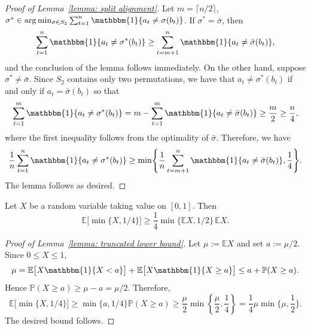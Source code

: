 \documentclass[twoside,11pt]{article}
\theoremstyle{remark}
\begin{document}
\begin{proof}[Proof of Lemma~\ref{lemma: split alignment}]
Let $m=\lceil n/2\rceil$, $\sigma^*
\in
\arg\min_{\sigma\in S_2}
\sum_{t=1}^{n}
\mathbbm{1}\{a_t\neq\sigma(b_t)\}$.
If $\sigma^*=\bar{\sigma}$, then
%
\begin{equation*}
\sum_{t=1}^{n}
\mathbbm{1}\{a_t\neq\sigma^*(b_t)\}
\ge
\sum_{t=m+1}^{n}
\mathbbm{1}\{a_t\neq\bar{\sigma}(b_t)\},   
\end{equation*}
%
and the conclusion of the lemma follows immediately. On the other hand, suppose $\sigma^*\neq\bar{\sigma}$. Since $S_2$ contains only two permutations, we have that $a_t \neq \sigma^*(b_t)$ if and only if $a_t = \bar{\sigma}(b_t)$ so that
%
\begin{equation*}
\sum_{t=1}^{m}
\mathbbm{1}\{a_t\neq\sigma^*(b_t)\}
=
m-
\sum_{t=1}^{m}
\mathbbm{1}\{a_t\neq\bar{\sigma}(b_t)\}
\ge
\frac m2
\ge
\frac n4,
\end{equation*}
%
where the first inequality follows from the optimality of $\bar\sigma$. 
Therefore, we have
%
\begin{equation*}
\frac{1}{n}\sum_{t=1}^{n}
\mathbbm{1}\{a_t\neq\sigma^*(b_t)\}
\ge
\min\Biggl\{
\frac{1}{n}\sum_{t=m+1}^{n}
\mathbbm{1}\{a_t\neq\bar{\sigma}(b_t)\},
\frac 14
\Biggr\}.    
\end{equation*}
%
The lemma follows as desired.
\end{proof}



\begin{lemma}
\label{lemma: truncated lower bound}
Let $X$ be a random variable taking value on $[0, 1]$. Then
%
\begin{equation*}
\mathbb{E}\bigl[\min\{X, 1/4\}\bigr]
\ge
\frac{1}{4}\min\bigl\{\mathbb{E}X, 1/2\bigr\}\,
\mathbb{E}X.    
\end{equation*}
%
\end{lemma}

\begin{proof}[Proof of Lemma~\ref{lemma: truncated lower bound}]
Let $\mu:=\mathbb{E}X$ and set $a:=\mu/2$. Since $0\le X\le 1$,
%
\begin{equation*}
\mu
=
\mathbb{E}\bigl[X\mathbbm{1}\{X<a\}\bigr]
+
\mathbb{E}\bigl[X\mathbbm{1}\{X\ge a\}\bigr]
\le
a+\mathbb{P}(X\ge a).    
\end{equation*}
%
Hence $\mathbb{P}(X\ge a)\ge \mu-a=\mu/2$. Therefore,
%
\begin{equation*}
\mathbb{E}\bigl[\min\{X,1/4\}\bigr]
\ge
\min\{a,1/4\}\mathbb{P}(X\ge a)
\ge
\frac{\mu}{2}\min\left\{\frac{\mu}{2},\frac14\right\}= \frac{1}{4}\mu\min\{\mu,\frac{1}{2}\}.    
\end{equation*}
%
The desired bound follows.
\end{proof}
\end{document}
